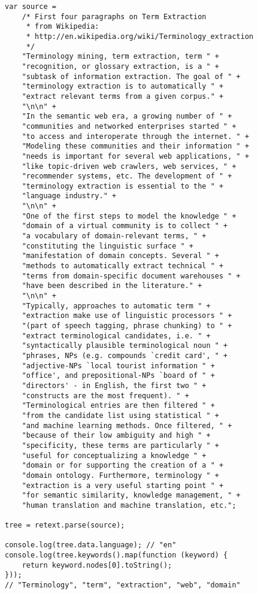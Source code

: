 \begin{lstlisting}
var source =
    /* First four paragraphs on Term Extraction
     * from Wikipedia:
     * http://en.wikipedia.org/wiki/Terminology_extraction
     */
    "Terminology mining, term extraction, term " +
    "recognition, or glossary extraction, is a " +
    "subtask of information extraction. The goal of " +
    "terminology extraction is to automatically " +
    "extract relevant terms from a given corpus." +
    "\n\n" +
    "In the semantic web era, a growing number of " +
    "communities and networked enterprises started " +
    "to access and interoperate through the internet. " +
    "Modeling these communities and their information " +
    "needs is important for several web applications, " +
    "like topic-driven web crawlers, web services, " +
    "recommender systems, etc. The development of " +
    "terminology extraction is essential to the " +
    "language industry." +
    "\n\n" +
    "One of the first steps to model the knowledge " +
    "domain of a virtual community is to collect " +
    "a vocabulary of domain-relevant terms, " +
    "constituting the linguistic surface " +
    "manifestation of domain concepts. Several " +
    "methods to automatically extract technical " +
    "terms from domain-specific document warehouses " +
    "have been described in the literature." +
    "\n\n" +
    "Typically, approaches to automatic term " +
    "extraction make use of linguistic processors " +
    "(part of speech tagging, phrase chunking) to " +
    "extract terminological candidates, i.e. " +
    "syntactically plausible terminological noun " +
    "phrases, NPs (e.g. compounds `credit card', " +
    "adjective-NPs `local tourist information " +
    "office', and prepositional-NPs `board of " +
    "directors' - in English, the first two " +
    "constructs are the most frequent). " +
    "Terminological entries are then filtered " +
    "from the candidate list using statistical " +
    "and machine learning methods. Once filtered, " +
    "because of their low ambiguity and high " +
    "specificity, these terms are particularly " +
    "useful for conceptualizing a knowledge " +
    "domain or for supporting the creation of a " +
    "domain ontology. Furthermore, terminology " +
    "extraction is a very useful starting point " +
    "for semantic similarity, knowledge management, " +
    "human translation and machine translation, etc.";

tree = retext.parse(source);

console.log(tree.data.language); // "en"
console.log(tree.keywords().map(function (keyword) {
    return keyword.nodes[0].toString();
}));
// "Terminology", "term", "extraction", "web", "domain"
\end{lstlisting}

